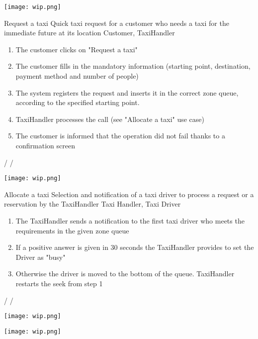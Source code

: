 \pagebreak
\texttt{[image: wip.png]}

\usecase
{Request a taxi}
{Quick taxi request for a customer who needs a taxi for the immediate future at its location}
{Customer, TaxiHandler}
{
\begin{enumerate}
	\item The customer clicks on "Request a taxi"
	\item The customer fills in the mandatory information (starting point, destination, payment method and number of people)
	\item The system registers the request and inserts it in the correct zone queue, according to the specified starting point.
	\item TaxiHandler processes the call (see "Allocate a taxi" use case)
	\item The customer is informed that the operation did not fail thanks to a confirmation screen
\end{enumerate}
}
{
/
}
{ 
/
}

\pagebreak
\texttt{[image: wip.png]}

\usecase
{Allocate a taxi}
{Selection and notification of a taxi driver to process a request or a reservation by the TaxiHandler}
{Taxi Handler, Taxi Driver}
{
\begin{enumerate}
	\item The TaxiHandler sends a notification to the first taxi driver who meets the requirements in the given zone queue
	\item If a positive answer is given in 30 seconds the TaxiHandler provides to set the Driver as "busy"
	\item Otherwise the driver is moved to the bottom of the queue. TaxiHandler restarts the seek from step 1
\end{enumerate}
}
{
/
}
{ 
/
}

\pagebreak
\texttt{[image: wip.png]}

\pagebreak
\texttt{[image: wip.png]}
